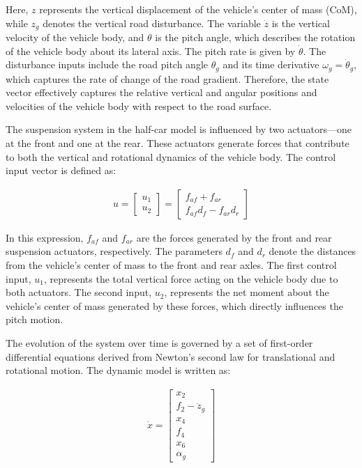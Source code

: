 \documentclass[]{report}
\begin{document}
Here, $z$ represents the vertical displacement of the vehicle’s center of mass (CoM), while $z_g$ denotes the vertical road disturbance. The variable $\dot{z}$ is the vertical velocity of the vehicle body, and $\theta$ is the pitch angle, which describes the rotation of the vehicle body about its lateral axis. The pitch rate is given by $\dot{\theta}$. The disturbance inputs include the road pitch angle $\theta_g$ and its time derivative $\omega_g = \dot{\theta}_g$, which captures the rate of change of the road gradient. Therefore, the state vector effectively captures the relative vertical and angular positions and velocities of the vehicle body with respect to the road surface.


\newpage

The suspension system in the half-car model is influenced by two actuators—one at the front and one at the rear. These actuators generate forces that contribute to both the vertical and rotational dynamics of the vehicle body. The control input vector is defined as:


\begin{align}
	u = \begin{bmatrix}
		u_1 \\
		u_2
	\end{bmatrix} =
	\begin{bmatrix}
		f_{af} + f_{ar} \\
		f_{af} d_f - f_{ar} d_r
	\end{bmatrix}
\end{align}

In this expression, $f_{af}$ and $f_{ar}$ are the forces generated by the front and rear suspension actuators, respectively. The parameters $d_f$ and $d_r$ denote the distances from the vehicle's center of mass to the front and rear axles. The first control input, $u_1$, represents the total vertical force acting on the vehicle body due to both actuators. The second input, $u_2$, represents the net moment about the vehicle’s center of mass generated by these forces, which directly influences the pitch motion.


The evolution of the system over time is governed by a set of first-order differential equations derived from Newton’s second law for translational and rotational motion. The dynamic model is written as:


\begin{align}
	\dot{x} = \begin{bmatrix}
		x_2 \\
		f_2 - \ddot{z}_g \\
		x_4 \\
		f_4 \\
		x_6 \\
		\alpha_g
	\end{bmatrix}
\end{align}
\end{document}
